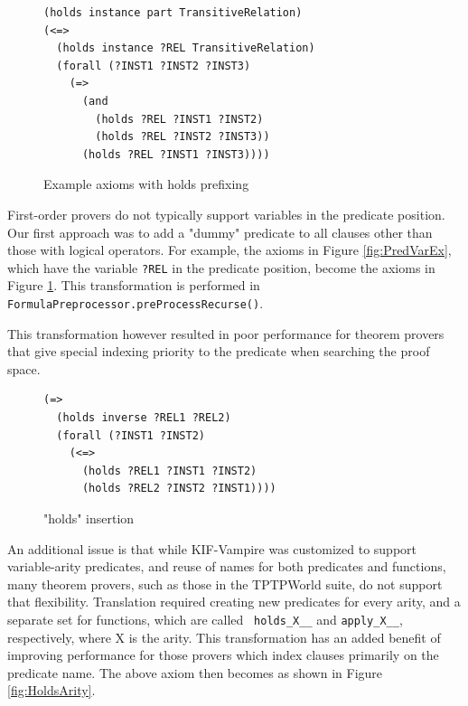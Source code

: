 \documentclass{book}
\begin{document}
\begin{figure}
\begin{framed}
\begin{verbatim}
(holds instance part TransitiveRelation)
(<=>
  (holds instance ?REL TransitiveRelation)
  (forall (?INST1 ?INST2 ?INST3)
    (=>
      (and
        (holds ?REL ?INST1 ?INST2)
        (holds ?REL ?INST2 ?INST3))
      (holds ?REL ?INST1 ?INST3))))
\end{verbatim}
\caption{Example axioms with holds prefixing}
\label{fig:HoldsPrefix}
\end{framed} 
\end{figure}

\begin{sloppypar}
First-order provers do not typically support variables in the predicate
position. Our first approach was to add a "dummy" predicate to all clauses other
than those with logical operators.   For example, the axioms in Figure
\ref{fig:PredVarEx}, which have the variable {\tt ?REL} in the predicate
position, become the axioms in Figure \ref{fig:HoldsPrefix}.  This transformation
is performed in \texttt{FormulaPreprocessor.preProcessRecurse()}.
\end{sloppypar}

This transformation however resulted in poor performance for theorem provers
that give special indexing priority to the predicate when searching the proof
space.

\begin{figure}
\begin{framed}
\begin{verbatim}
(=>
  (holds inverse ?REL1 ?REL2)
  (forall (?INST1 ?INST2)
    (<=>
      (holds ?REL1 ?INST1 ?INST2)
      (holds ?REL2 ?INST2 ?INST1))))
\end{verbatim}
\caption{"holds" insertion}
\label{fig:HoldsInsert}
\end{framed} 
\end{figure}

An additional issue is that while KIF-Vampire was customized to support
variable-arity predicates, and reuse of names for both predicates and functions,
many theorem provers, such as those in the TPTPWorld suite, do not support that
flexibility.  Translation required creating new predicates for every
arity, and a separate set for functions, which are called {\tt
holds\_X\_\_} and {\tt apply\_X\_\_}, respectively, where X is the arity.  This
transformation has an added benefit of improving performance for those provers
which index clauses primarily on the predicate name.  The above axiom then
becomes as shown in Figure \ref{fig:HoldsArity}.
\end{document}
